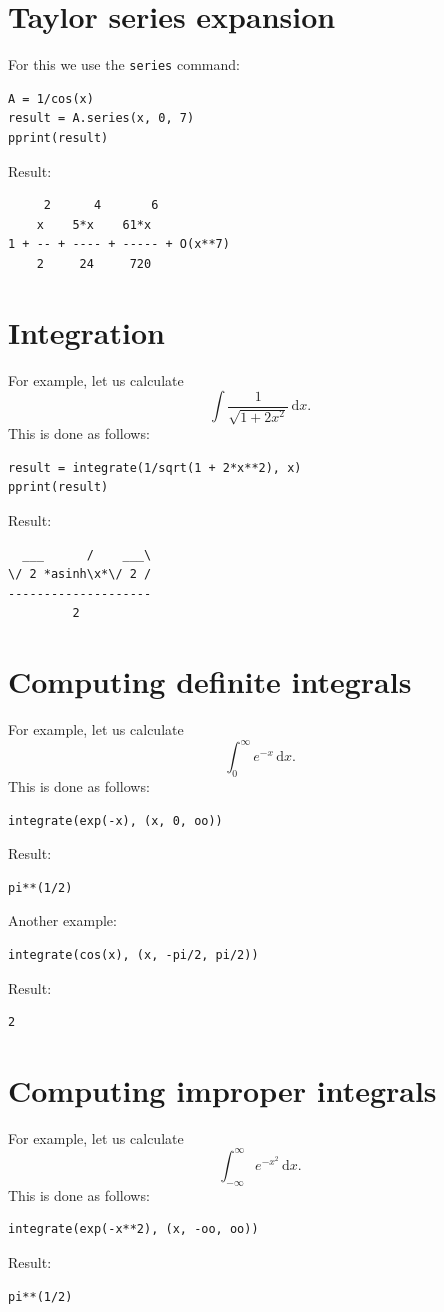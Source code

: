 \documentclass[article,A4,12pt]{llncs}
\def\x{\mathbf{x}}
\begin{document}
\section{Taylor series expansion}

For this we use the {\tt series} command:
\begin{verbatim}
A = 1/cos(x)
result = A.series(x, 0, 7)
pprint(result)
\end{verbatim}
Result:
\begin{verbatim}
     2      4       6          
    x    5*x    61*x           
1 + -- + ---- + ----- + O(x**7)
    2     24     720           
\end{verbatim}

\section{Integration}

For example, let us calculate 
$$
\int \frac{1}{\sqrt{1 + 2x^2}}\, \mbox{d} x.
$$
This is done as follows:
\begin{verbatim}
result = integrate(1/sqrt(1 + 2*x**2), x)
pprint(result)
\end{verbatim}
Result:
\begin{verbatim}
  ___      /    ___\
\/ 2 *asinh\x*\/ 2 /
--------------------
         2      
\end{verbatim}

\section{Computing definite integrals}

For example, let us calculate
$$
\int_0^{\infty} e^{-x}\, \mbox{d} x.
$$
This is done as follows:
\begin{verbatim}
integrate(exp(-x), (x, 0, oo))
\end{verbatim}
Result:
\begin{verbatim}
pi**(1/2)
\end{verbatim}
Another example:
\begin{verbatim}
integrate(cos(x), (x, -pi/2, pi/2))
\end{verbatim}
Result:
\begin{verbatim}
2
\end{verbatim}

\section{Computing improper integrals}

For example, let us calculate
$$
\int_{-\infty}^{\infty} e^{-x^2}\, \mbox{d} x.
$$
This is done as follows:
\begin{verbatim}
integrate(exp(-x**2), (x, -oo, oo))
\end{verbatim}
Result:
\begin{verbatim}
pi**(1/2)
\end{verbatim}
\end{document}
